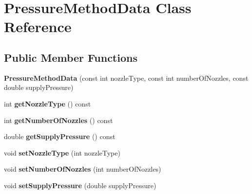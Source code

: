 \hypertarget{class_pressure_method_data}{}\section{Pressure\+Method\+Data Class Reference}
\label{class_pressure_method_data}
\subsection*{Public Member Functions}
\begin{DoxyCompactItemize}
\item 
\mbox{\label{class_pressure_method_data_ae3f1dfefb362732f0c43fc44a94f7199}} 
{\bfseries Pressure\+Method\+Data} (const int nozzle\+Type, const int number\+Of\+Nozzles, const double supply\+Pressure)
\item 
\mbox{\label{class_pressure_method_data_a8c314e5670651ed22cdc3cd2cbddd23a}} 
int {\bfseries get\+Nozzle\+Type} () const
\item 
\mbox{\label{class_pressure_method_data_acdb45460fa558f7d93b649c5304a8e1c}} 
int {\bfseries get\+Number\+Of\+Nozzles} () const
\item 
\mbox{\label{class_pressure_method_data_a99913643fee384381bd634a14c113d77}} 
double {\bfseries get\+Supply\+Pressure} () const
\item 
\mbox{\label{class_pressure_method_data_a2f6ad84c90de786d6cee92dd89073e5c}} 
void {\bfseries set\+Nozzle\+Type} (int nozzle\+Type)
\item 
\mbox{\label{class_pressure_method_data_ac02b84da973601d4533f40396d3aa8c8}} 
void {\bfseries set\+Number\+Of\+Nozzles} (int number\+Of\+Nozzles)
\item 
\mbox{\label{class_pressure_method_data_a2319ade60f1e688bed667c8bdc969291}} 
void {\bfseries set\+Supply\+Pressure} (double supply\+Pressure)
\item 
\mbox{\label{class_pressure_method_data_a85415f718377f2ee10c1bbd36f4ffef1}} 

\end{DoxyCompactItemize}
